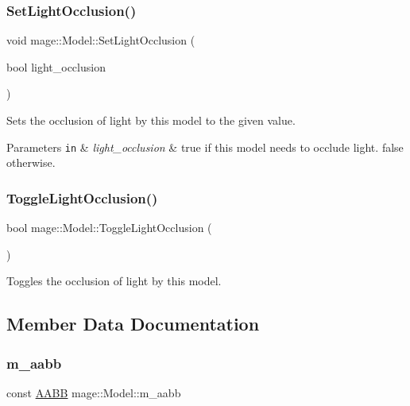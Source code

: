 \subsubsection{\texorpdfstring{Set\+Light\+Occlusion()}{SetLightOcclusion()}}
{\footnotesize\ttfamily void mage\+::\+Model\+::\+Set\+Light\+Occlusion (\begin{DoxyParamCaption}\item[{bool}]{light\+\_\+occlusion }\end{DoxyParamCaption})\hspace{0.3cm}{\ttfamily [noexcept]}}

Sets the occlusion of light by this model to the given value.


\begin{DoxyParams}[1]{Parameters}
\mbox{\tt in}  & {\em light\+\_\+occlusion} & {\ttfamily true} if this model needs to occlude light. {\ttfamily false} otherwise. \\
\hline
\end{DoxyParams}
\hypertarget{classmage_1_1_model_a68168e66cb04c08f27616e9d7768a99e}{}\label{classmage_1_1_model_a68168e66cb04c08f27616e9d7768a99e} 
\subsubsection{\texorpdfstring{Toggle\+Light\+Occlusion()}{ToggleLightOcclusion()}}
{\footnotesize\ttfamily bool mage\+::\+Model\+::\+Toggle\+Light\+Occlusion (\begin{DoxyParamCaption}{ }\end{DoxyParamCaption})\hspace{0.3cm}{\ttfamily [noexcept]}}

Toggles the occlusion of light by this model. 

\subsection{Member Data Documentation}
\hypertarget{classmage_1_1_model_ab53a0f253df545fd59723bee107bf523}{}\label{classmage_1_1_model_ab53a0f253df545fd59723bee107bf523} 
\subsubsection{\texorpdfstring{m\+\_\+aabb}{m\_aabb}}
{\footnotesize\ttfamily const \hyperlink{structmage_1_1_a_a_b_b}{A\+A\+BB} mage\+::\+Model\+::m\+\_\+aabb\hspace{0.3cm}{\ttfamily [private]}}

